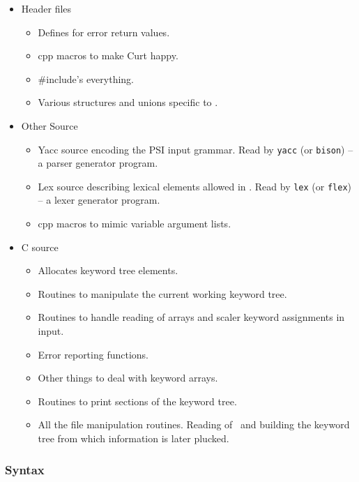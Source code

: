 \begin{itemize}
\item Header files
  \begin{itemize}
  \item {} Defines for error return values.
  \item {} cpp macros to make Curt happy.
  \item {} \#include's everything.
  \item {} Various structures and unions specific to
                          .
  \end{itemize}
\item Other Source
  \begin{itemize}
  \item {} Yacc source encoding the PSI input grammar.
  Read by {\tt yacc} (or {\tt bison}) -- a parser generator program.
  \item {} Lex source describing lexical elements allowed
  in . Read by {\tt lex} (or {\tt flex}) -- a lexer generator
  program. 
  \item {} cpp macros to mimic variable argument lists.
  \end{itemize}
\item C source
  \begin{itemize} 
  \item {} Allocates keyword tree elements.
  \item {} Routines to manipulate the current working
                       keyword tree.
  \item {} Routines to handle reading of arrays and
                         scaler keyword assignments in input.
  \item {} Error reporting functions.
  \item {} Other things to deal with keyword arrays.
  \item {} Routines to print sections of the keyword
  tree.
  \item {} All the file manipulation routines.  Reading
                  of \ and building the keyword tree from
                  which information is later plucked.
  \end{itemize}
\end{itemize}

\subsubsection{Syntax}

